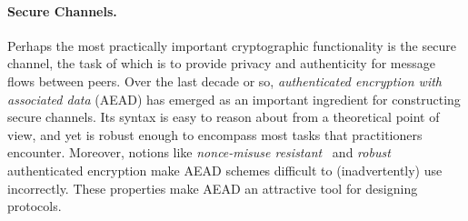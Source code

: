 \paragraph{Secure Channels. }
\fi
Perhaps the most practically important cryptographic functionality is the
secure channel, the task of which is to provide privacy and authenticity for
message flows between peers.
%
Over the last decade or so, \emph{authenticated encryption with associated data}
(AEAD) has emerged as an important ingredient for constructing secure channels.
%
Its syntax is easy to reason about from a theoretical point of view, and yet is
robust enough to encompass most tasks that practitioners encounter. Moreover,
notions like \emph{nonce-misuse resistant}~\cite{RS06} and
\emph{robust}~\cite{HKR15} authenticated encryption make AEAD schemes difficult
to (inadvertently) use incorrectly. These properties make AEAD an attractive
tool for designing protocols.

